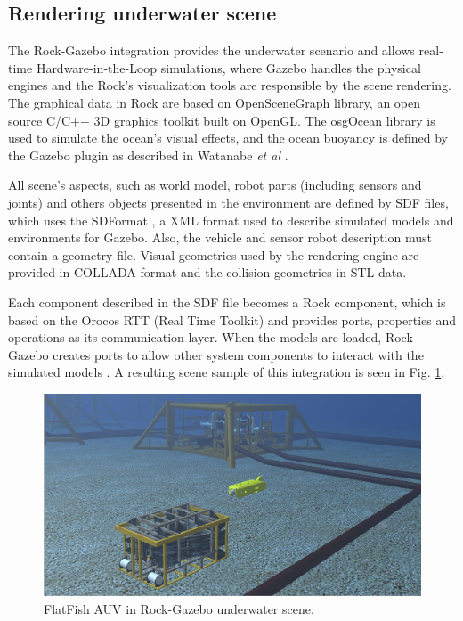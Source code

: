 \documentclass[final,5p,times]{elsarticle}
\begin{document}

\subsection{Rendering underwater scene}
\label{dev:uwscene}

The Rock-Gazebo integration \cite{watanabe2015} provides the underwater scenario and allows real-time Hardware-in-the-Loop simulations, where Gazebo handles the physical engines and the Rock's visualization tools are responsible by the scene rendering. The graphical data in Rock are based on OpenSceneGraph library, an open source C/C++ 3D graphics toolkit built on OpenGL. The osgOcean library is used to simulate the ocean's visual effects, and the ocean buoyancy is defined by the Gazebo plugin as described in Watanabe \textit{et al} \cite{watanabe2015}.

All scene's aspects, such as world model, robot parts (including sensors and joints) and others objects presented in the environment are defined by SDF files, which uses the SDFormat \cite{sdformat2017}, a XML format used to describe simulated models and environments for Gazebo. Also, the vehicle and sensor robot description must contain a geometry file. Visual geometries used by the rendering engine are provided in COLLADA format and the collision geometries in STL data.

Each component described in the SDF file becomes a Rock component, which is based on the Orocos RTT (Real Time Toolkit) \cite{soetens2005} and provides ports, properties and operations as its communication layer. When the models are loaded, Rock-Gazebo creates ports to allow other system components to interact with the simulated models \cite{cerqueira2016}. A resulting scene sample of this integration is seen in Fig. \ref{fig:uwscene}.

\begin{figure}[t]
    \includegraphics[width=\columnwidth]{figs/uwscene}
    \centering
    \captionsetup{justification=centering}
    \caption{FlatFish AUV in Rock-Gazebo underwater scene.}
    \label{fig:uwscene}
\end{figure}
\end{document}
